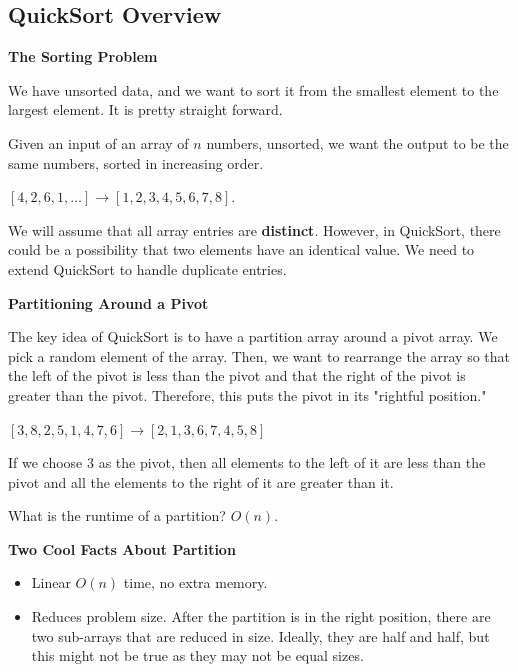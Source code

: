 \documentclass[11pt]{article}
\newcommand{\boldsec}[1]{
    \vspace{11pt}
    \textbf{#1}
    \vspace{11pt}
}
\newcommand{\boldsecbottom}[1]{
    \textbf{#1}
    \vspace{11pt}
}
\begin{document}
\newpage
\subsection{QuickSort Overview}
\vspace{11pt}

\boldsecbottom{The Sorting Problem}

We have unsorted data, and we want to sort it from the smallest element to the largest element. It is pretty straight forward.

Given an input of an array of $n$ numbers, unsorted, we want the output to be the same numbers, sorted in increasing order.

\vspace{11pt}
$[4,2,6,1, \dots] \to [1,2,3,4,5,6,7,8]$.

\vspace{11pt}
We will assume that all array entries are \textbf{distinct}. However, in QuickSort, there could be a possibility that two elements have an identical value. We need to extend QuickSort to handle duplicate entries.

\boldsec{Partitioning Around a Pivot}

The key idea of QuickSort is to have a partition array around a pivot array. We pick a random element of the array. Then, we want to rearrange the array so that the left of the pivot is less than the pivot and that the right of the pivot is greater than the pivot. Therefore, this puts the pivot in its "rightful position."

\vspace{11pt}
$[3,8,2,5,1,4,7,6] \to [2,1,3,6,7,4,5,8]$

\vspace{11pt}

If we choose $3$ as the pivot, then all elements to the left of it are less than the pivot and all the elements to the right of it are greater than it.

\vspace{11pt}
What is the runtime of a partition? $O(n)$.

\boldsec{Two Cool Facts About Partition}

\begin{itemize}
    \item Linear $O(n)$ time, no extra memory.
    \item Reduces problem size. After the partition is in the right position, there are two sub-arrays that are reduced in size. Ideally, they are half and half, but this might not be true as they may not be equal sizes.
\end{itemize}
\end{document}
